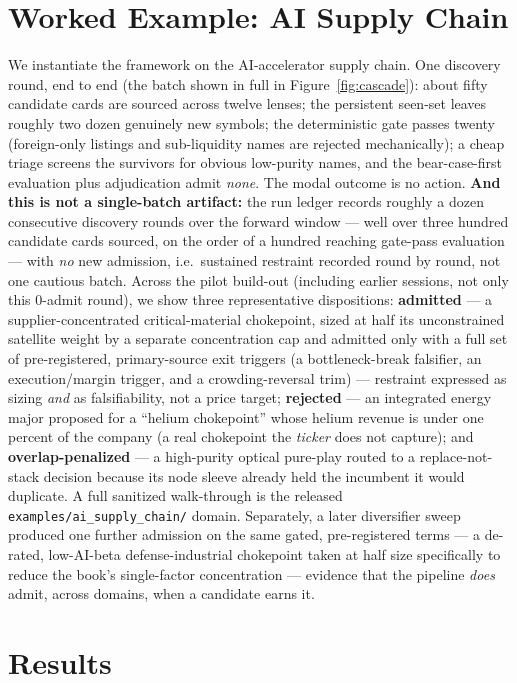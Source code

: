 \documentclass[11pt]{article}
\begin{document}
\section{Worked Example: AI Supply Chain}
We instantiate the framework on the AI-accelerator supply chain. One discovery round, end to end
(the batch shown in full in Figure~\ref{fig:cascade}): about fifty candidate cards are sourced across
twelve lenses; the persistent seen-set leaves roughly two dozen genuinely new symbols; the
deterministic gate passes twenty (foreign-only listings and sub-liquidity names are rejected
mechanically); a cheap triage screens the survivors for obvious low-purity names, and the
bear-case-first evaluation plus adjudication admit \emph{none}. The modal outcome is no action.
\textbf{And this is not a single-batch artifact:} the run ledger records roughly a dozen consecutive
discovery rounds over the forward window --- well over three hundred candidate cards sourced, on the
order of a hundred reaching gate-pass evaluation --- with \emph{no} new admission, i.e.\ sustained
restraint recorded round by round, not one cautious batch.
Across the pilot build-out (including earlier sessions, not only this 0-admit round), we show three
representative dispositions: \textbf{admitted} --- a supplier-concentrated
critical-material chokepoint, sized at half its unconstrained satellite weight by a separate
concentration cap and admitted only with a full set of pre-registered, primary-source exit triggers
(a bottleneck-break falsifier, an execution/margin trigger, and a crowding-reversal trim) --- restraint
expressed as sizing \emph{and} as falsifiability, not a price target; \textbf{rejected} --- an integrated energy major
proposed for a ``helium chokepoint'' whose helium revenue is under one percent of the company (a real
chokepoint the \emph{ticker} does not capture); and \textbf{overlap-penalized} --- a high-purity
optical pure-play routed to a replace-not-stack decision because its node sleeve already held the
incumbent it would duplicate. A full sanitized walk-through is the released
\texttt{examples/ai\_supply\_chain/} domain. Separately, a later diversifier sweep produced one further
admission on the same gated, pre-registered terms --- a de-rated, low-AI-beta defense-industrial
chokepoint taken at half size specifically to reduce the book's single-factor concentration --- evidence
that the pipeline \emph{does} admit, across domains, when a candidate earns it.

\section{Results}
\end{document}
